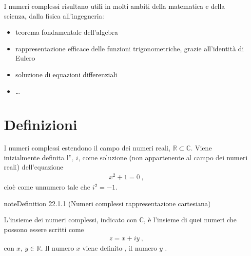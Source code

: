 \documentclass[letterpaper,10pt,italian]{jupyterBook}
\begin{document}
\sphinxAtStartPar
I numeri complessi risultano utili in molti ambiti della matematica e della scienza, dalla fisica all’ingegneria:
\begin{itemize}
\item {} 
\sphinxAtStartPar
teorema fondamentale dell’algebra

\item {} 
\sphinxAtStartPar
rappresentazione efficace delle funzioni trigonometriche, grazie all’identità di Eulero

\item {} 
\sphinxAtStartPar
soluzione di equazioni differenziali

\item {} 
\sphinxAtStartPar
…

\end{itemize}




\section{Definizioni}
\label{\detokenize{ch/algebra/complex-algebra:definizioni}}\label{\detokenize{ch/algebra/complex-algebra:math-hs-algebra-complex-def}}
\sphinxAtStartPar
I numeri complessi estendono il campo dei numeri reali, \(\mathbb{R} \subset \mathbb{C}\). Viene inizialmente definita l”, \(i\), come soluzione (non appartenente al campo dei numeri reali) dell’equazione
\begin{equation*}
\begin{split}x^2 + 1 = 0 \ ,\end{split}
\end{equation*}
\sphinxAtStartPar
cioè come un\sphinxfootnotemark[1] numero tale che \(i^2 = - 1\).

\sphinxAtStartPar
{}  
\label{ch/algebra/complex-algebra:complex-cartesian}
\begin{sphinxadmonition}{note}{Definition 22.1.1 (Numeri complessi \sphinxhyphen{} rappresentazione cartesiana)}



\sphinxAtStartPar
L’insieme dei numeri complessi, indicato con \(\mathbb{C}\), è l’insieme di quei numeri che possono essere scritti come
\begin{equation*}
\begin{split}z = x + i y \ ,\end{split}
\end{equation*}
\sphinxAtStartPar
con \(x, \ y \in \mathbb{R}\). Il numero \(x\) viene definito , il numero \(y\) .
\end{sphinxadmonition}
\end{document}
